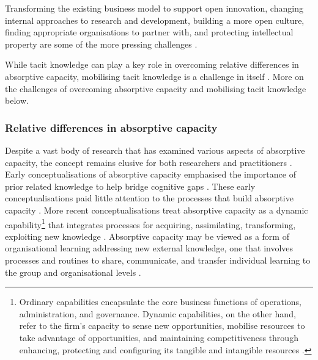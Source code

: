 Transforming the existing business model to support open innovation, changing internal approaches to research and development, building a more open culture, finding appropriate organisations to partner with, and protecting intellectual property are some of the more pressing challenges \citep{dahlander2010open,sieg2010managerial,lichtenthaler2011your,durst2013success,roper2013externalities,aloini2016structured}. 

While tacit knowledge can play a key role in overcoming relative differences in absorptive capacity, mobilising tacit knowledge is a challenge in itself \citep{gassmann2004towards,bahemia2010contingent,bogers2011open}. More on the challenges of overcoming absorptive capacity and mobilising tacit knowledge below. \medskip

\subsubsection{Relative differences in absorptive capacity}


 
Despite a vast body of research that has examined various aspects of absorptive capacity, the concept remains elusive for both researchers and practitioners \citep{duchek2013capturing,omidvar2013revisiting}. Early conceptualisations of absorptive capacity emphasised the importance of prior related knowledge to help bridge cognitive gaps \citep{cohen1989innovation,cohen1990absorptive}. These early conceptualisations paid little attention to the processes that build absorptive capacity \citep{zahra2002absorptive}. More recent conceptualisations treat absorptive capacity as a dynamic capability\footnote{Ordinary capabilities encapsulate the core business functions of operations, administration, and governance. Dynamic capabilities, on the other hand, refer to the firm's capacity to sense new opportunities, mobilise resources to take advantage of opportunities, and maintaining competitiveness through enhancing, protecting and configuring its tangible and intangible resources \citep{teece2007explicating,teece2014foundations}.} that integrates processes for acquiring, assimilating, transforming, exploiting new knowledge \citep{zahra2002absorptive,lane2006reification,todorova2007absorptive,volberda2010perspective,lewin2011microfoundations,marabelli2014knowing}. Absorptive capacity may be viewed as a form of organisational learning addressing new external knowledge, one that involves processes and routines to share, communicate, and transfer individual learning to the group and organisational levels \citep{sun2010examination}. \medskip

